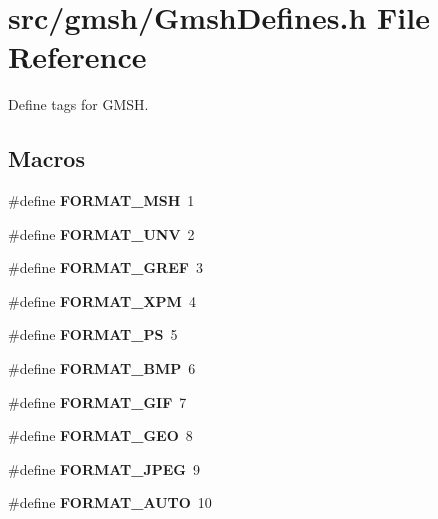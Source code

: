 \section{src/gmsh/\-Gmsh\-Defines.h File Reference}
\label{GmshDefines_8h}


Define tags for G\-M\-S\-H.  


\subsection*{Macros}
\begin{DoxyCompactItemize}
\item 
\#define {\bfseries F\-O\-R\-M\-A\-T\-\_\-\-M\-S\-H}~1\label{GmshDefines_8h_a1eb78f6cacf5fd3b6568e700fbfa5ca8}

\item 
\#define {\bfseries F\-O\-R\-M\-A\-T\-\_\-\-U\-N\-V}~2\label{GmshDefines_8h_a245f8f029cecc82f0e22c755e82ad4db}

\item 
\#define {\bfseries F\-O\-R\-M\-A\-T\-\_\-\-G\-R\-E\-F}~3\label{GmshDefines_8h_a543f19db8f49e3a16494b82373ebe0dd}

\item 
\#define {\bfseries F\-O\-R\-M\-A\-T\-\_\-\-X\-P\-M}~4\label{GmshDefines_8h_a2b1fcd5b4e985714474c4c28e0f65604}

\item 
\#define {\bfseries F\-O\-R\-M\-A\-T\-\_\-\-P\-S}~5\label{GmshDefines_8h_adfaafac6d30042a69cb4d9c0cfa88391}

\item 
\#define {\bfseries F\-O\-R\-M\-A\-T\-\_\-\-B\-M\-P}~6\label{GmshDefines_8h_a96f3435830a38097e4e68373ae34b8f0}

\item 
\#define {\bfseries F\-O\-R\-M\-A\-T\-\_\-\-G\-I\-F}~7\label{GmshDefines_8h_aeb0dff48af713dc9273107820c0d4cf0}

\item 
\#define {\bfseries F\-O\-R\-M\-A\-T\-\_\-\-G\-E\-O}~8\label{GmshDefines_8h_a4bc752ef98b8edf625e742c66ddd4c6f}

\item 
\#define {\bfseries F\-O\-R\-M\-A\-T\-\_\-\-J\-P\-E\-G}~9\label{GmshDefines_8h_a32398bd23ac7bd37e3c7100b1e4bdbbd}

\item 
\#define {\bfseries F\-O\-R\-M\-A\-T\-\_\-\-A\-U\-T\-O}~10\label{GmshDefines_8h_a19e24bc4a5fea02c06e604852f05453f}


\end{DoxyCompactItemize}
